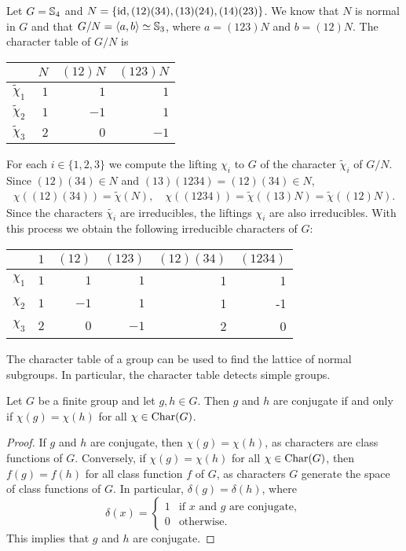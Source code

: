 \begin{example}
    Let $G=\mathbb{S}_4$ and $N=\{\operatorname{id},(12)(34),(13)(24),(14)(23)\}$. We know that $N$ is normal in $G$ 
    and that $G/N=\langle a,b\rangle\simeq\mathbb{S}_3$, where 
    $a=(123)N$ and $b=(12)N$. 
    The character table of $G/N$ is 
    \begin{center}
		\begin{tabular}{|c|rrr|}
			\hline
			& $N$ & $(12)N$ & $(123)N$ \tabularnewline
			\hline 
			$\widetilde{\chi}_{1}$ & $1$ & $1$ & $1$\tabularnewline
			$\widetilde{\chi}_{2}$ & $1$ & $-1$ & $1$ \tabularnewline
			$\widetilde{\chi}_{3}$ & $2$ & $0$ & $-1$ \tabularnewline
			\hline
		\end{tabular}
	\end{center}
    For each $i\in\{1,2,3\}$ we compute the lifting $\chi_i$ to $G$ of the character  
    $\widetilde{\chi}_i$ of $G/N$. 
    Since $(12)(34)\in N$ and $(13)(1234)=(12)(34)\in N$, 
    \begin{align*}
        \chi( (12)(34) )=\widetilde{\chi}(N),\quad
        \chi( (1234) )=\widetilde{\chi}((13)N)=\widetilde{\chi}((12)N).
    \end{align*}
    Since the characters $\widetilde{\chi_i}$ are irreducibles, 
    the liftings $\chi_i$ are also irreducibles. With this process
    we obtain the following irreducible characters of $G$:
    	\begin{center}
		\begin{tabular}{|c|rrrrr|}
			\hline
			& $1$ & $(12)$ & $(123)$ & $(12)(34)$ & $(1234)$ \tabularnewline
			\hline 
			$\chi_{1}$ & $1$ & $1$ & $1$ & 1 & 1\tabularnewline
			$\chi_{2}$ & $1$ & $-1$ & $1$ & 1 & -1 \tabularnewline
			$\chi_{3}$ & $2$ & $0$ & $-1$ & 2 & 0\tabularnewline
			\hline
		\end{tabular}
	\end{center}
\end{example}

The character table of a group can be used to find the lattice 
of normal subgroups. In particular, the character table detects simple groups. 

\begin{lemma}
    Let $G$ be a finite group and 
    let $g,h\in G$. Then $g$ and $h$ 
    are conjugate if and only if 
    $\chi(g)=\chi(h)$ for all
    $\chi\in\operatorname{Char}(G)$. 
\end{lemma}

\begin{proof}
    If $g$ and $h$ are conjugate, then $\chi(g)=\chi(h)$, as characters are class functions
    of $G$.
    Conversely, if $\chi(g)=\chi(h)$ for all $\chi\in\operatorname{Char}(G)$, then 
    $f(g)=f(h)$ for all class function $f$ of $G$, 
    as characters $G$ generate the space of class functions of $G$. In particular, 
    $\delta(g)=\delta(h)$, where
    \[
    \delta(x)=\begin{cases}
    1 & \text{if $x$ and $g$ are conjugate},\\
    0 & \text{otherwise}.
    \end{cases}
    \]
    This implies that $g$ and $h$ are conjugate.
\end{proof}

